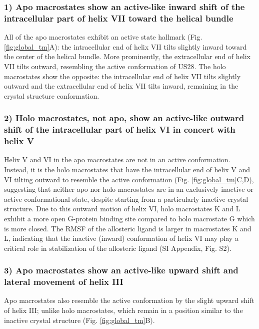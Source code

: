 \documentclass[9pt,twocolumn,twoside]{pnas-new}
\begin{document}
\subsubsection*{1) Apo macrostates show an active-like inward shift of the intracellular part of helix VII toward the helical bundle}
All of the apo macrostates exhibit an active state hallmark (Fig. \ref{fig:global_tm}A): the intracellular end of helix VII tilts slightly inward toward the center of the helical bundle.
More prominently, the extracellular end of helix VII tilts outward, resembling the active conformation of US28.
The holo macrostates show the opposite: the intracellular end of helix VII tilts slightly outward and the extracellular end of helix VII tilts inward, remaining in the crystal structure conformation.

\subsubsection*{2) Holo macrostates, not apo, show an active-like outward shift of the intracellular part of helix VI in concert with helix V}
Helix V and VI in the apo macrostates are not in an active conformation.
Instead, it is the holo macrostates that have the intracellular end of helix V and VI tilting outward to resemble the active conformation (Fig. \ref{fig:global_tm}C,D), suggesting that neither apo nor holo macrostates are in an exclusively inactive or active conformational state, despite starting from a particularly inactive crystal structure.
Due to this outward motion of helix VI, holo macrostates K and L exhibit a more open G-protein binding site compared to holo macrostate G which is more closed. The RMSF of the allosteric ligand is larger in macrostates K and L, indicating that the inactive (inward) conformation of helix VI may play a critical role in stabilization of the allosteric ligand (SI Appendix, Fig. S2).

\subsubsection*{3) Apo macrostates show an active-like upward shift and lateral movement of helix III}
Apo macrostates also resemble the active conformation by the slight upward shift of helix III; unlike holo macrostates, which remain in a position similar to the inactive crystal structure (Fig. \ref{fig:global_tm}B).
\end{document}
